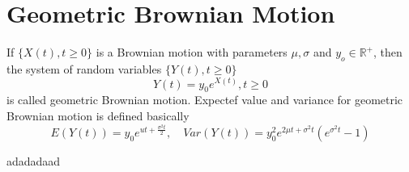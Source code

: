 \documentclass[a4paper]{article}
\begin{document}
\section{Geometric Brownian Motion}
If $\{ X(t), t\geq 0\}$ is a Brownian motion with parameters $\mu, \sigma$ and $y_o \in \mathbb{R} ^ +$, then the system of random variables $\{ Y(t), t\geq 0\}$
\begin{equation}
    Y(t) = y_0 e^{X(t)}, t \geq 0
\end{equation}
is called geometric Brownian motion. Expectef value and variance for geometric Brownian motion is defined basically
\begin{equation}
    E(Y(t)) = y_0 e^{ut + \frac{\sigma ^ 2 t}{2}}, \quad Var(Y(t)) = y_0 ^ {2} e ^ {2 \mu t + \sigma^2 t} ( e ^ {\sigma ^ 2 t} - 1)
\end{equation}

adadadaad
\end{document}
